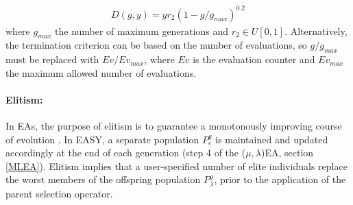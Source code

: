 \begin{eqnarray}
   D(g,y) = y r_2 (1-g/g_{max})^{0.2}
\end{eqnarray}
where $g_{max}$ the number of maximum generations and $r_2\in U[0,1]$. Alternatively, the termination criterion can be based on the number of evaluations, so $g/g_{max}$ must be replaced with $Ev/Ev_{max}$, where $Ev$ is the evaluation counter and $Ev_{max}$ the maximum allowed number of evaluations.  




\paragraph{Elitism:}
In EAs, the purpose of elitism is to guarantee a monotonously improving course of evolution \cite{Back1996}. In EASY, a separate population $P_e^g$ is maintained and updated accordingly at the end of each generation (step 4 of the ($\mu,\lambda$)EA, section \ref{MLEA}). Elitism implies that a user-specified number of elite individuals replace the worst members of the offspring population $P^g_{\lambda}$, prior to the application of the parent selection operator.
  
